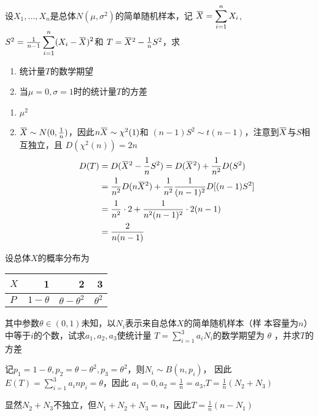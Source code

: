\documentclass{article}
\begin{document}
\begin{examplle}[]
设\(X_1,\dots,X_n\)是总体\(N(\mu,\sigma^2)\)的简单随机样本，记
\(\bbar{X}=\displaystyle\sum_{i=1}^nX_i\),
\(S^2=\frac{1}{n-1}\displaystyle\sum_{i=1}^n(X_i-\bbar{X})^2\)和
\(T=\bbar{X}^2-\frac{1}{n}S^2\)，求
\begin{enumerate}
\item 统计量\(T\)的数学期望
\item 当\(\mu=0,\sigma=1\)时的统计量\(T\)的方差
\end{enumerate}


\begin{enumerate}
\item \(\mu^2\)
\item \(\bbar{X}\sim N(0,\frac{1}{n})\)，因此\(n\bbar{X}\sim\chi^2(1)\)和
\((n-1)S^2\sim t(n-1)\)，注意到\(\bbar{X}\)与\(S\)相互独立，且
\(D(\chi^2(n))=2n\)
\begin{align*}
D(T)&=D(\bbar{X}^2-\frac{1}{n}S^2)=D(\bbar{X}^2)+\frac{1}{n^2}D(S^2)\\
&=\frac{1}{n^2}D(n\bbar{X}^2)+\frac{1}{n^2}\frac{1}{(n-1)^2}D[(n-1)S^2]\\
&=\frac{1}{n^2}\cdot 2+\frac{1}{n^2(n-1)^2}\cdot 2(n-1)\\
&=\frac{2}{n(n-1)}
\end{align*}
\end{enumerate}
\end{examplle}

\begin{examplle}[]
设总体\(X\)的概率分布为
\begin{center}
\begin{tabular}{l|rrr}
\(X\) & 1 & 2 & 3\\
\hline
\(P\) & \(1-\theta\) & \(\theta-\theta^2\) & \(\theta^2\)\\
\end{tabular}
\end{center}

其中参数\(\theta\in(0,1)\)未知，以\(N_i\)表示来自总体\(X\)的简单随机样本（样
本容量为\(n\)）中等于\(i\)的个数，试求\(a_1,a_2,a_3\)使统计量
\(T=\displaystyle\sum_{i=1}^3a_iN_i\)的数学期望为 \(\theta\) ，并求\(T\)的方差

记\(p_1=1-\theta,p_2=\theta-\theta^2,p_3=\theta^2\)，则\(N_i\sim B(n,p_i)\)，
因此\(E(T)=\displaystyle\sum_{i=1}^3a_inp_i=\theta\)，因此
\(a_1=0,a_2=\frac{1}{n}=a_3\),\(T=\frac{1}{n}(N_2+N_3)\)

显然\(N_2+N_3\)不独立，但\(N_1+N_2+N_3=n\)，因此\(T=\frac{1}{n}(n-N_1)\)
\end{examplle}
\end{document}
